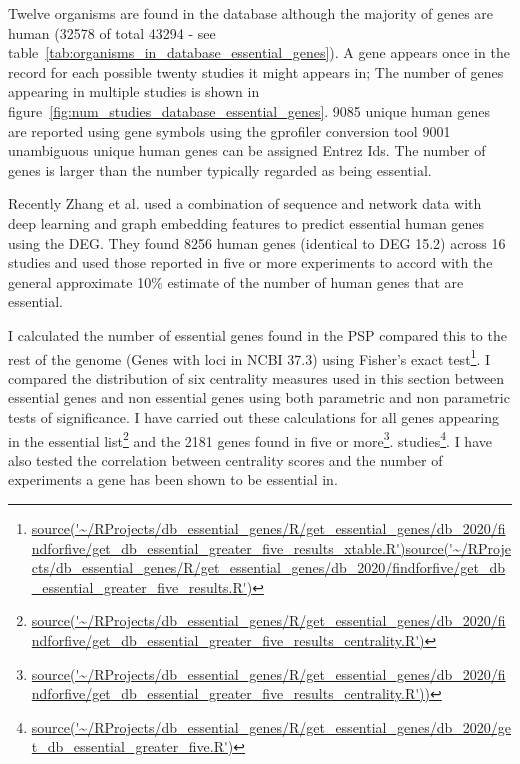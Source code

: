 Twelve organisms are found in the database although the majority of genes are human (32578 of total 43294 - see table~\ref{tab:organisms_in_database_essential_genes}). A gene appears once in the record for each possible twenty studies it might appears in; The number of genes appearing in multiple studies is shown in figure~\ref{fig:num_studies_database_essential_genes}. 9085 unique human genes are reported using gene symbols using the gprofiler conversion tool 9001 unambiguous unique human genes can be assigned Entrez Ids. The number of genes is larger than the number typically regarded as being essential. 
 
 Recently Zhang et al.\cite{zhao2020misuse} used a combination of sequence and network data with deep learning and graph embedding features to predict essential human genes using the DEG. They found 8256 human genes (identical to DEG 15.2) across 16 studies and used those reported in five or more experiments to accord with the general approximate 10\% estimate of the number of human genes that are essential\cite{wang2015identification}. 
 
 
 I calculated the number of essential genes found in the PSP compared this to the rest of the genome (Genes with loci in NCBI 37.3) using Fisher's exact test\footnote{\url{source('~/RProjects/db_essential_genes/R/get_essential_genes/db_2020/findforfive/get_db_essential_greater_five_results_xtable.R')}\url{source('~/RProjects/db_essential_genes/R/get_essential_genes/db_2020/findforfive/get_db_essential_greater_five_results.R')}
 }. I compared the distribution of six centrality measures used in this section between essential genes and non essential genes using both parametric and non parametric tests of significance. I have carried out these calculations for all genes appearing in the essential list\footnote{\url{source('~/RProjects/db_essential_genes/R/get_essential_genes/db_2020/findforfive/get_db_essential_greater_five_results_centrality.R')}
 } and the 2181 genes found in five or more\footnote{\url{source('~/RProjects/db_essential_genes/R/get_essential_genes/db_2020/findforfive/get_db_essential_greater_five_results_centrality.R'))}}. studies\footnote{\url{source('~/RProjects/db_essential_genes/R/get_essential_genes/db_2020/get_db_essential_greater_five.R')}}. I have also tested the correlation between centrality scores and the number of experiments a gene has been shown to be essential in.  
 
